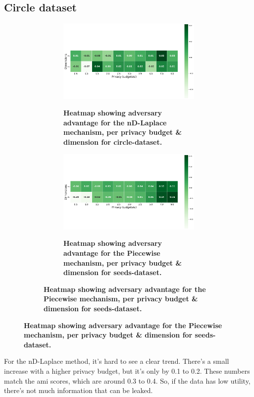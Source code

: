 \subsection{Circle dataset}
\begin{figure}[H]
  \centering
  \begin{subfigure}[b]{0.85\textwidth}
    \begin{subfigure}[c]{1\textwidth}
      \caption{\textbf{Heatmap showing adversary advantage for the nD-Laplace mechanism, per privacy budget \& dimension for circle-dataset.}}
      \includegraphics[width=1\textwidth]{Results/nd-laplace/nd-Laplace/circle-dataset/attack_adv.png}
      \label{fig:privacy_circle-dataset_adversial_advantage_kd-laplace}
    \end{subfigure}
    \vfill %
    \begin{subfigure}[c]{1\textwidth}
      \caption{\textbf{Heatmap showing adversary advantage for the Piecewise mechanism, per privacy budget \& dimension for seeds-dataset.}}
      \includegraphics[width=1\textwidth]{Results/nd-laplace/piecewise/circle-dataset/attack_adv.png}
      \label{fig:privacy_circle-dataset_adversial_advantage_piecewise}
    \end{subfigure}
  \end{subfigure}
\end{figure}
For the nD-Laplace method, it's hard to see a clear trend. There's a small increase with a higher privacy budget, but it's only by 0.1 to 0.2. These numbers match the \gls{ami} scores, which are around 0.3 to 0.4. So, if the data has low utility, there's not much information that can be leaked.

